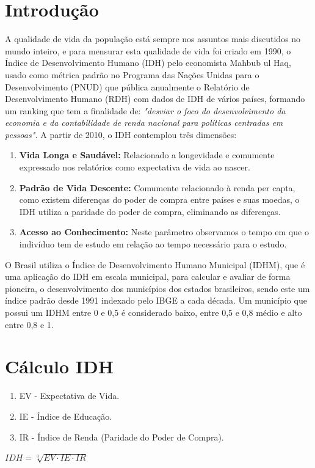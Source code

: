 \documentclass[10pt,foldmark,notumble]{leaflet}
\begin{document}
\section{Introdução}
A qualidade de vida da população está sempre nos assuntos mais discutidos no mundo inteiro, e para mensurar esta qualidade de vida foi criado em 1990, o Índice de Desenvolvimento Humano (IDH) pelo economista Mahbub ul Haq\cite{PNUD2017}\cite{Licia2009}\cite{loureiroimpacto}, usado como métrica padrão no Programa das Nações Unidas para o Desenvolvimento (PNUD) que pública anualmente o Relatório de Desenvolvimento Humano (RDH) com dados de IDH de vários países, formando um ranking\cite{PNUD2017} que tem a finalidade de: \emph{"desviar o foco do desenvolvimento da economia e da contabilidade de renda nacional para políticas centradas em pessoas\cite{Haq1995}".}
A partir de 2010, o IDH contemplou três dimensões\cite{Atlas2017}\cite{Licia2009}:

\begin{enumerate}
\item  {\textbf{Vida Longa e Saudável:} Relacionado a longevidade e comumente expressado nos relatórios como expectativa de vida ao nascer.}
\item  {\textbf{Padrão de Vida Descente:} Comumente relacionado à renda per capta, como existem diferenças do poder de compra entre países e suas moedas, o IDH utiliza a paridade do poder de compra, eliminando as diferenças.\cite{Licia2009}}
\item  {\textbf{Acesso ao Conhecimento:} Neste parâmetro observamos o tempo em que o indivíduo tem de estudo em relação ao tempo necessário para o estudo.}
\end{enumerate}

O Brasil utiliza o Índice de Desenvolvimento Humano Municipal (IDHM), que é uma aplicação do IDH em escala municipal, para calcular e avaliar de forma pioneira, o desenvolvimento dos municípios dos estados brasileiros, sendo este um índice padrão desde 1991 indexado pelo IBGE a cada década. Um município que possui um IDHM entre 0 e 0,5 é considerado baixo, entre 0,5 e 0,8 médio e alto entre 0,8 e 1.\cite{IBGE2017}\cite{Atlas2017}

\section{Cálculo IDH}

\begin{enumerate}
			\item EV - Expectativa de Vida.
			\item IE - Índice de Educação.
			\item IR - Índice de Renda (Paridade do Poder de Compra).
		\end{enumerate}
\vspace{15pt}        
\begin{center}
                    $IDH = \sqrt[3] {EV \cdot IE \cdot IR}$
           \end{center}
\end{document}
